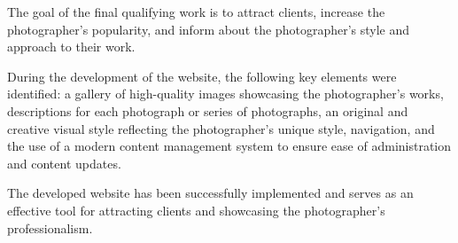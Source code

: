 The goal of the final qualifying work is to attract clients, increase the photographer's popularity, and inform about the photographer's style and approach to their work.

During the development of the website, the following key elements were identified: a gallery of high-quality images showcasing the photographer's works, descriptions for each photograph or series of photographs, an original and creative visual style reflecting the photographer's unique style, navigation, and the use of a modern content management system to ensure ease of administration and content updates.

The developed website has been successfully implemented and serves as an effective tool for attracting clients and showcasing the photographer's professionalism.
